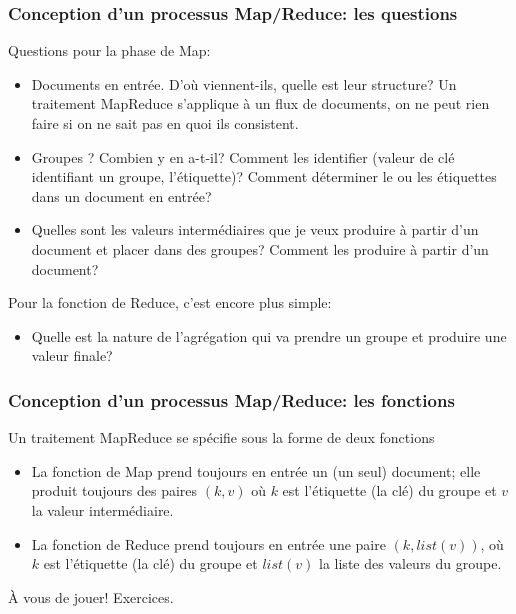\begin{frame}[fragile]
\frametitle{Conception d'un processus Map/Reduce: les questions}

Questions pour la phase de Map:
\begin{itemize}
  \item  Documents en entrée. D'où viennent-ils,
    quelle est leur structure? Un traitement MapReduce s'applique à un flux de documents, on
    ne peut rien faire si on ne sait pas en quoi ils consistent.

  \item Groupes ? Combien y en a-t-il? Comment les
    identifier (valeur de clé identifiant un groupe, l'étiquette)? Comment déterminer 
    le ou les étiquettes  dans un document en entrée?

  \item Quelles sont les valeurs intermédiaires que je veux produire à partir d'un document et
    placer dans des groupes? Comment les produire à partir d'un document?
\end{itemize}

Pour la fonction de Reduce, c'est encore plus simple:
\begin{itemize}
  \item Quelle est la nature de l'agrégation qui va prendre un groupe et produire une valeur finale?
\end{itemize}
\end{frame}



\begin{frame}[fragile]
\frametitle{Conception d'un processus Map/Reduce: les fonctions}


Un traitement MapReduce se spécifie sous la forme de deux fonctions

\begin{itemize}

  \item La fonction de Map prend \alert{toujours} en entrée \alert{un} (un seul) document;
   elle produit \alert{toujours} des paires $(k, v)$ où $k$ est l'étiquette (la clé) du groupe
   et $v$ la valeur intermédiaire.
 \item La fonction de Reduce prend \alert{toujours} en entrée une paire $(k, list(v))$,
   où $k$ est l'étiquette (la clé) du groupe
   et $list(v)$ la liste des valeurs du groupe.
\end{itemize}
   
\vfill

À vous de jouer! Exercices.

\end{frame}